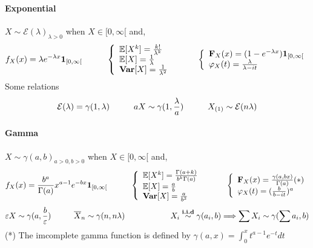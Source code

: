 \documentclass[a4paper,10pt]{article}
\begin{document}
\paragraph{Exponential} $X\sim \mathcal{E}(\lambda)_{\lambda>0}$ when $X \in [0,\infty[$ and,
\[
f_{X}(x) = \lambda e^{-\lambda x} \mathbf{1}_{[0,\infty[}
\hspace{10mm}
\left\{
\begin{array}{l}
\mathbb{E}[X^k]=\frac{k!}{\lambda^k} \\
\mathbb{E}[X]=\frac{1}{\lambda} \\
\textbf{Var}[X]=\frac{1}{\lambda^2} 
\end{array}\right.
\hspace{10mm}
\left\{
\begin{array}{l}
\textbf{F}_X(x) = (1- e^{-\lambda x})\mathbf{1}_{[0,\infty[} \\
\varphi_{X}(t) = \frac{\lambda}{\lambda - it}
\end{array}\right.
\]
Some relations
\[
\mathcal{E}(\lambda) = \gamma(1,\lambda)
\hspace{10mm}
aX \sim \gamma(1,\frac{\lambda}{a})
\hspace{10mm}
X_{(1)} \sim \mathcal{E}(n\lambda)
\]

\paragraph{Gamma} $X\sim \gamma(a,b)_{a>0,b>0}$ when $X \in [0,\infty[$ and,
\[
f_{X}(x) = \frac{b^a}{\Gamma(a)} x^{a-1} e^{-bx} \mathbf{1}_{[0,\infty[}
\hspace{10mm}
\left\{
\begin{array}{l}
\mathbb{E}[X^k]=\frac{\Gamma(a+k)}{b^k\Gamma(a)} \\
\mathbb{E}[X]=\frac{a}{b} \\
\textbf{Var}[X]=\frac{a}{b^2} 
\end{array}\right.
\hspace{10mm}
\left\{
\begin{array}{l}
\textbf{F}_X(x) = \frac{\gamma(a,bx)}{\Gamma(a)} (*)  \\
\varphi_{X}(t) = (\frac{b}{b - it})^a
\end{array}\right.
\]
\[
\varepsilon X \sim \gamma(a,\frac{b}{\varepsilon})
\hspace{10mm}
\overline{X}_n \sim \gamma(n,n\lambda)
\hspace{20mm}
X_i \stackrel{\textbf{i.i.d}}{\sim} \gamma(a_i,b) \Longrightarrow \sum X_i \sim \gamma(\sum a_i, b)
\]
(*) The imcomplete gamma function is defined by $\gamma(a,x) = \int_{0}^{x} t^{a-1}e^{-t}dt $
\end{document}
